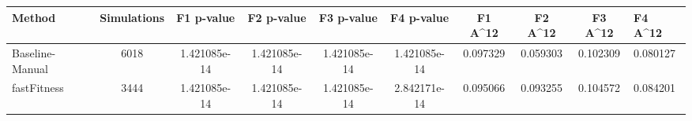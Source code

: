 \begin{tabular}{lcccccccc}
\toprule
         Method &  Simulations &   F1 p-value &   F2 p-value &   F3 p-value &   F4 p-value &  F1 A^12 &  F2 A^12 &  F3 A^12 &  F4 A^12 \\
\midrule
Baseline-Manual &         6018 & 1.421085e-14 & 1.421085e-14 & 1.421085e-14 & 1.421085e-14 & 0.097329 & 0.059303 & 0.102309 & 0.080127 \\
    fastFitness &         3444 & 1.421085e-14 & 1.421085e-14 & 1.421085e-14 & 2.842171e-14 & 0.095066 & 0.093255 & 0.104572 & 0.084201 \\
\bottomrule
\end{tabular}
